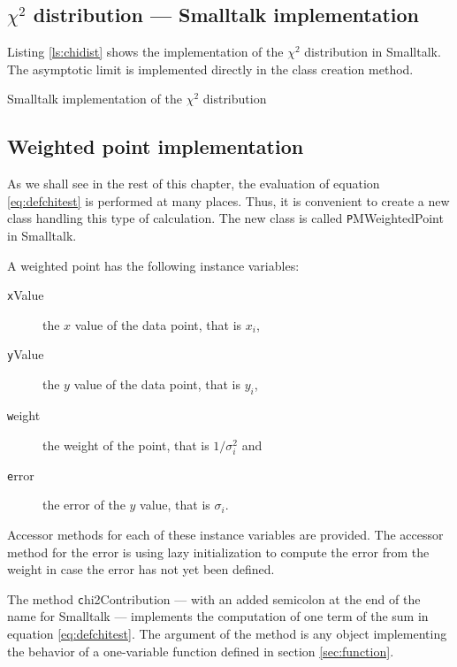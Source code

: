 \subsection{$\chi^2$ distribution --- Smalltalk implementation}
 Listing \ref{ls:chidist} shows
the implementation of the $\chi^2$ distribution in Smalltalk. The
asymptotic limit is implemented directly in the class creation
method.
\begin{listing} Smalltalk implementation of the $\chi^2$ distribution \label{ls:chidist}

\end{listing}


\subsection{Weighted point implementation}
\label{sec:weightedPoint}  As we shall see in the rest of this chapter, the
evaluation of equation \ref{eq:defchitest} is performed at many
places. Thus, it is convenient to create a new class handling this
type of calculation.
The new class is called {\texttt PMWeightedPoint} in Smalltalk.

\noindent A weighted point has the following instance variables:
\begin{description}
  \item[\texttt xValue] the $x$ value of the data point, that is $x_i$,
  \item[\texttt yValue] the $y$ value of the data point, that is $y_i$,
  \item[\texttt weight] the weight of the point, that is $1/\sigma_i^2$
  and
  \item[\texttt error] the error of the $y$ value, that is $\sigma_i$.
\end{description}
Accessor methods for each of these instance variables are
provided. The accessor method for the error is using lazy
initialization to compute the error from the weight in case the
error has not yet been defined.

The method {\texttt chi2Contribution} --- with an added semicolon at
the end of the name for Smalltalk --- implements the computation
of one term of the sum in equation \ref{eq:defchitest}. The
argument of the method is any object implementing the behavior of
a one-variable function defined in section \ref{sec:function}.

